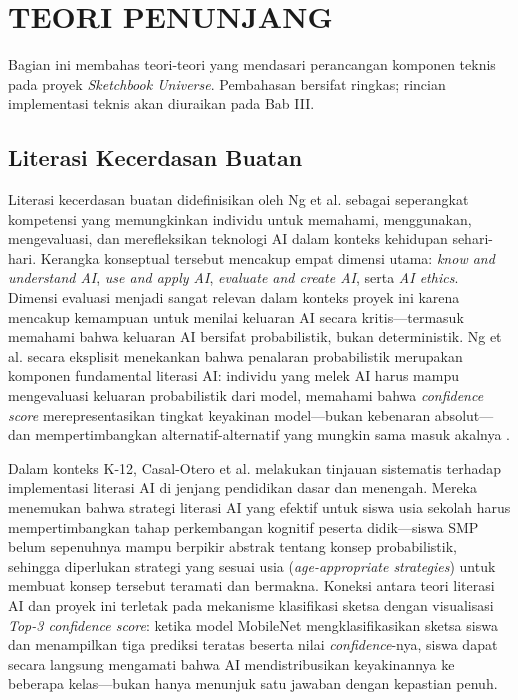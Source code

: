 \documentclass[12pt,a4paper,oneside,openany]{report}
\begin{document}
\section{TEORI PENUNJANG}
\label{sec:teori-penunjang}

Bagian ini membahas teori-teori yang mendasari perancangan komponen teknis pada proyek \textit{Sketchbook Universe}. Pembahasan bersifat ringkas; rincian implementasi teknis akan diuraikan pada Bab III.

\subsection{Literasi Kecerdasan Buatan}
\label{subsec:literasi-kb}

Literasi kecerdasan buatan didefinisikan oleh Ng et al. \cite{ref1} sebagai seperangkat kompetensi yang memungkinkan individu untuk memahami, menggunakan, mengevaluasi, dan merefleksikan teknologi AI dalam konteks kehidupan sehari-hari. Kerangka konseptual tersebut mencakup empat dimensi utama: \textit{know and understand AI}, \textit{use and apply AI}, \textit{evaluate and create AI}, serta \textit{AI ethics}. Dimensi evaluasi menjadi sangat relevan dalam konteks proyek ini karena mencakup kemampuan untuk menilai keluaran AI secara kritis---termasuk memahami bahwa keluaran AI bersifat probabilistik, bukan deterministik. Ng et al. secara eksplisit menekankan bahwa penalaran probabilistik merupakan komponen fundamental literasi AI: individu yang melek AI harus mampu mengevaluasi keluaran probabilistik dari model, memahami bahwa \textit{confidence score} merepresentasikan tingkat keyakinan model---bukan kebenaran absolut---dan mempertimbangkan alternatif-alternatif yang mungkin sama masuk akalnya \cite{ref1}.

Dalam konteks K-12, Casal-Otero et al. \cite{ref2} melakukan tinjauan sistematis terhadap implementasi literasi AI di jenjang pendidikan dasar dan menengah. Mereka menemukan bahwa strategi literasi AI yang efektif untuk siswa usia sekolah harus mempertimbangkan tahap perkembangan kognitif peserta didik---siswa SMP belum sepenuhnya mampu berpikir abstrak tentang konsep probabilistik, sehingga diperlukan strategi yang sesuai usia (\textit{age-appropriate strategies}) untuk membuat konsep tersebut teramati dan bermakna. Koneksi antara teori literasi AI dan proyek ini terletak pada mekanisme klasifikasi sketsa dengan visualisasi \textit{Top-3 confidence score}: ketika model MobileNet mengklasifikasikan sketsa siswa dan menampilkan tiga prediksi teratas beserta nilai \textit{confidence}-nya, siswa dapat secara langsung mengamati bahwa AI mendistribusikan keyakinannya ke beberapa kelas---bukan hanya menunjuk satu jawaban dengan kepastian penuh.
\end{document}
